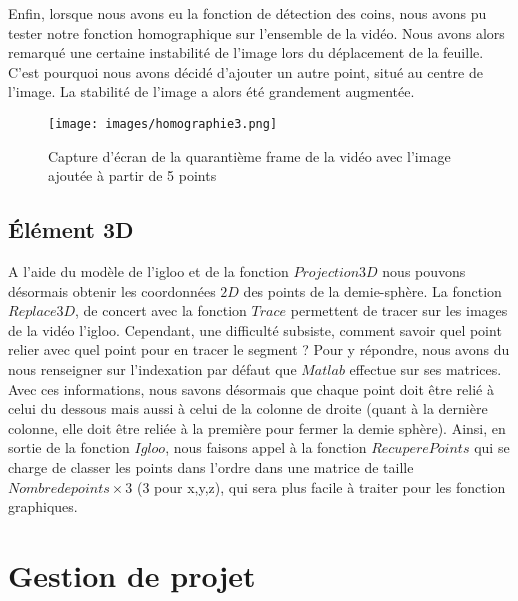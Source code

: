 \documentclass[blue]{ceri/sty/rapport}
\begin{document}
Enfin, lorsque nous avons eu la fonction de détection des coins, nous avons pu tester notre fonction homographique sur l'ensemble de la vidéo. Nous avons alors remarqué une certaine instabilité de l'image lors du déplacement de la feuille. C'est pourquoi nous avons décidé d'ajouter un autre point, situé au centre de l'image. La stabilité de l'image a alors été grandement augmentée.

\begin{figure}[H]
\centering
\texttt{[image: images/homographie3.png]}
\caption[homographie3]{Capture d'écran de la quarantième frame de la vidéo avec l'image ajoutée à partir de 5 points}
\label{fig:homographie2}
\end{figure}



\subsection{Élément 3D}

A l'aide du modèle de l'igloo et de la fonction $Projection3D$ nous pouvons désormais obtenir les coordonnées $2D$ des points de la demie-sphère. La fonction $Replace3D$, de concert avec la fonction $Trace$ permettent de tracer sur les images de la vidéo l'igloo. 
Cependant, une difficulté subsiste, comment savoir quel point relier avec quel point pour en tracer le segment ? 
Pour y répondre, nous avons du nous renseigner sur l'indexation par défaut que $Matlab$ effectue sur ses matrices. Avec ces informations, nous savons désormais que chaque point doit être relié à celui du dessous mais aussi à celui de la colonne de droite (quant à la dernière colonne, elle doit être reliée à la première pour fermer la demie sphère). Ainsi, en sortie de la fonction $Igloo$, nous faisons appel à la fonction $RecuperePoints$ qui se charge de classer les points dans l'ordre dans une matrice de taille $Nombre de points \times 3$ (3 pour x,y,z), qui sera plus facile à traiter pour les fonction graphiques. 
\section{Gestion de projet}
\label{sec:Generalites4}
\end{document}
